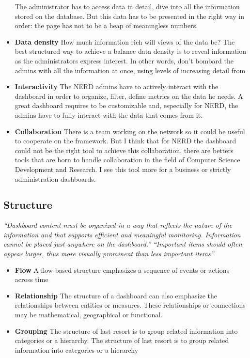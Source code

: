 \documentclass[a4paper,13pt]{report}
\begin{document}
\begin{itemize}
The administrator has to access data in detail, dive into all the information stored on the database. But this data has to be presented in the right way in order: the page has not to be a heap of meaningless numbers.
\item \textbf{Data density}\newline
 How much information rich will views of the data be? The best structured way to achieve a balance data density is to reveal information as the administrators express interest. In other words, don't bombard the admins with all the information at once, using levels of increasing detail from 
\item \textbf{Interactivity}\newline
The NERD admins have to actively interact with the dashboard in order to organize, filter, define metrics on the data he needs. A great dashboard requires to be customizable and, especially for NERD, the admins have to fully interact with the data that comes from it.
\item \textbf{Collaboration}\newline
There is a team working on the network so it could be useful to cooperate on the framework. But I think that for NERD the dashboard could not be the right tool to achieve this collaboration, there are betters tools that are born to handle collaboration in the field of Computer Science Development and Research. 
I see this tool more for a business or strictly administration dashboards.
\end{itemize}
\subsection{Structure}
\emph{``Dashboard content must be organized in a way that reflects the nature of the information and that supports efficient and meaningful monitoring. Information cannot be placed just anywhere on the dashboard.''}\newline
\emph{``Important items should often appear larger, thus more visually prominent than less important items''}

\begin{itemize}
    \item \textbf{Flow}\newline
    A flow-based structure emphasizes a sequence of events or actions across time
    \item \textbf{Relationship}\newline
    The structure of a dashboard can also emphasize the relationships between entities or measures. These relationships or connections may be mathematical, geographical or functional.
    \item \textbf{Grouping}\newline
    The structure of last resort is to group related information into categories or a hierarchy. The structure of last resort is to group related information into categories or a hierarchy
\end{itemize}
\end{document}
